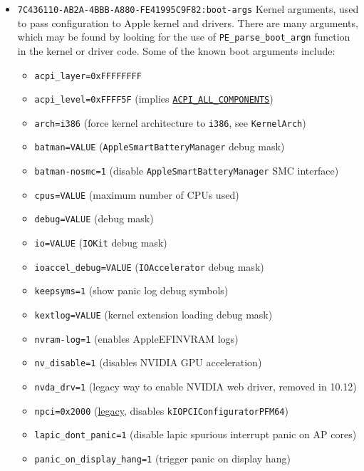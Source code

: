 \documentclass[]{article}
\providecommand{\tightlist}{%
  \setlength{\itemsep}{0pt}\setlength{\parskip}{0pt}}
\begin{document}
\begin{itemize}
\tightlist
\item
  \texttt{7C436110-AB2A-4BBB-A880-FE41995C9F82:boot-args}
  \break
  Kernel arguments, used to pass configuration to Apple kernel and drivers.
  There are many arguments, which may be found by looking for the use of
  \texttt{PE\_parse\_boot\_argn} function in the kernel or driver code.
  Some of the known boot arguments include:

  \begin{itemize}
  \item \texttt{acpi\_layer=0xFFFFFFFF}
  \item \texttt{acpi\_level=0xFFFF5F} (implies
    \href{https://github.com/acpica/acpica/blob/master/source/include/acoutput.h}
    {\texttt{ACPI\_ALL\_COMPONENTS}})
  \item \texttt{arch=i386} (force kernel architecture to \texttt{i386}, see \texttt{KernelArch})
  \item \texttt{batman=VALUE} (\texttt{AppleSmartBatteryManager} debug mask)
  \item \texttt{batman-nosmc=1} (disable \texttt{AppleSmartBatteryManager} SMC interface)
  \item \texttt{cpus=VALUE} (maximum number of CPUs used)
  \item \texttt{debug=VALUE} (debug mask)
  \item \texttt{io=VALUE} (\texttt{IOKit} debug mask)
  \item \texttt{ioaccel\_debug=VALUE} (\texttt{IOAccelerator} debug mask)
  \item \texttt{keepsyms=1} (show panic log debug symbols)
  \item \texttt{kextlog=VALUE} (kernel extension loading debug mask)
  \item \texttt{nvram-log=1} (enables AppleEFINVRAM logs)
  \item \texttt{nv\_disable=1} (disables NVIDIA GPU acceleration)
  \item \texttt{nvda\_drv=1} (legacy way to enable NVIDIA web driver, removed in 10.12)
  \item \texttt{npci=0x2000} (\href{https://www.insanelymac.com/forum/topic/260539-1068-officially-released/?do=findComment&comment=1707972}{legacy}, disables \texttt{kIOPCIConfiguratorPFM64})
  \item \texttt{lapic\_dont\_panic=1} (disable lapic spurious interrupt panic on AP cores)
  \item \texttt{panic\_on\_display\_hang=1} (trigger panic on display hang)

\end{itemize}
\end{itemize}
\end{document}
